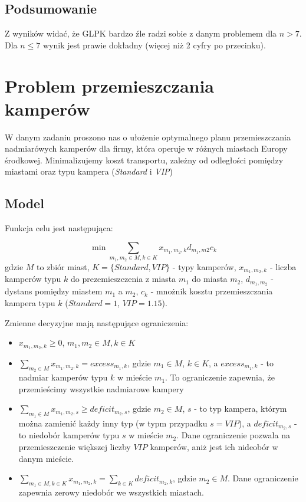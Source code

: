 \documentclass[12pt, a4paper]{article}
\begin{document}
\subsection{Podsumowanie}

Z wyników widać, że GLPK bardzo źle radzi sobie z danym problemem dla $n > 7$. Dla $n \leq 7$ wynik jest prawie dokładny (więcej niż 2 cyfry po przecinku).


\section{Problem przemieszczania kamperów}

W danym zadaniu proszono nas o ułożenie optymalnego planu przemieszczania
nadmiarówych kamperów dla firmy, która operuje w różnych miastach Europy środkowej.
Minimalizujemy koszt transportu, zależny od odległości pomiędzy miastami oraz typu kampera (\textit{Standard} i \textit{VIP})

\subsection{Model}

Funkcja celu jest następująca:

\[\min \sum_{m_1, m_2 \in M, k \in K} x_{m_1, m_2, k}d_{m_1, m2}c_{k}\]
gdzie $M$ to zbiór miast, $K=\{Standard, VIP\}$ - typy kamperów, $x_{m_1,m_2,k}$ - liczba kamperów typu $k$ do
prezemieszczenia z miasta $m_1$ do miasta $m_2$, $d_{m_1, m_2}$ - dystans pomiędzy miastem $m_1$ a $m_2$, $c_{k}$ - mnożnik kosztu
przemieszczania kampera typu $k$ ($Standard = 1$, $VIP = 1.15$).

Zmienne decyzyjne mają następujące ograniczenia:

\begin{itemize}
  \item $x_{m_1, m_2, k} \geq 0$, $m_1, m_2 \in M, k \in K$
  \item $\sum_{m_2 \in M} x_{m_1, m_2, k} = excess_{m_1, k}$, gdzie $m_1 \in M$, $k \in K$, a $excess_{m_1, k}$ - to nadmiar kamperów typu $k$ w mieście $m_1$. To ograniczenie zapewnia, że przemieścimy wszystkie nadmiarowe kampery
  \item $\sum_{m_1 \in M} x_{m_1, m_2, s} \geq deficit_{m_2, s}$, gdzie $m_2 \in M$, $s$ - to typ kampera, którym można zamienić każdy inny typ (w typm przypadku $s = VIP$), a $deficit_{m_2, s}$ - to niedobór kamperów typu $s$ w mieście $m_2$. Dane ograniczenie pozwala na przemieszczenie większej liczby $VIP$ kamperów, aniż jest ich nideobór w danym mieście.
  \item $\sum_{m_1 \in M, k \in K} x_{m_1, m_2, k} = \sum_{k \in K} deficit_{m_2, k}$, gdzie $m_2 \in M$. Dane ograniczenie zapewnia zerowy niedobór we wszystkich miastach.
\end{itemize}
\end{document}
